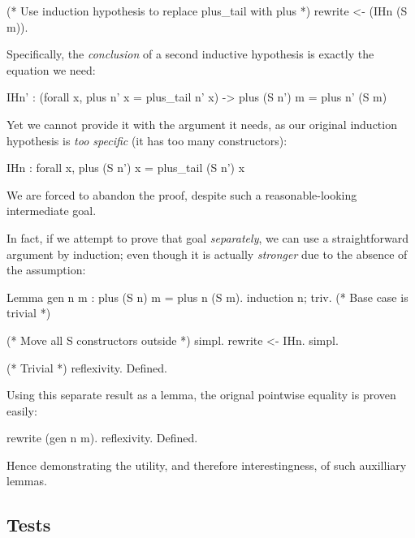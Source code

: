 {\begin{coqblock}
  (* Use induction hypothesis to replace plus_tail with plus *)
  rewrite <- (IHn (S m)).
\end{coqblock}

Specifically, the \emph{conclusion} of a second inductive hypothesis is exactly
the equation we need:

\begin{coqblock}
IHn' : (forall x, plus n' x = plus_tail n' x) -> plus (S n') m = plus n' (S m)
\end{coqblock}

Yet we cannot provide it with the argument it needs, as our original induction
hypothesis is \emph{too specific} (it has too many  constructors):

\begin{coqblock}
IHn : forall x, plus (S n') x = plus_tail (S n') x
\end{coqblock}

We are forced to abandon the proof, despite such a reasonable-looking
intermediate goal.

In fact, if we attempt to prove that goal \emph{separately}, we can use a
straightforward argument by induction; even though it is actually
\emph{stronger} due to the absence of the  assumption:

\begin{coqblock}
Lemma gen n m : plus (S n) m = plus n (S m).
  induction n; triv. (* Base case is trivial *)

  (* Move all S constructors outside *)
  simpl. rewrite <- IHn. simpl.

  (* Trivial *)
  reflexivity.
Defined.
\end{coqblock}

Using this separate result as a lemma, the orignal pointwise equality is proven
easily:

\begin{coqblock}
  rewrite (gen n m).
  reflexivity.
Defined.
\end{coqblock}

Hence demonstrating the utility, and therefore interestingness, of such
auxilliary lemmas.


\subsection{Tests}

}
